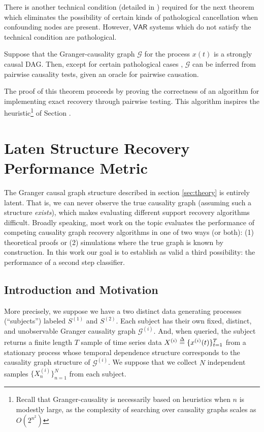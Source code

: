 \documentclass[12pt]{article}
\def\gcg{\mathcal{G}}  %
\def\VAR{\mathsf{VAR}}  %
\begin{document}
  There is another technical condition (detailed in
  \cite{my_GC_paper}) required for the next theorem which eliminates
  the possibility of certain kinds of pathological cancellation when
  confounding nodes are present.  However, $\VAR$ systems which do not
  satisfy the technical condition are pathological.

  \begin{theorem}
    \label{thm:scg_recovery}
    Suppose that the Granger-causality graph $\gcg$ for the process
    $x(t)$ is a strongly causal DAG.  Then, except for certain
    pathological cases \cite{my_GC_paper}, $\gcg$ can be inferred from
    pairwise causality tests, given an oracle for pairwise causation.
  \end{theorem}

  The proof of this theorem proceeds by proving the correctness of an
  algorithm for implementing exact recovery through pairwise testing.
  This algorithm inspires the heuristic\footnote{Recall that
    Granger-causality is necessarily based on heuristics when $n$ is
    modestly large, as the complexity of searching over causality
    graphs scales as $O(2^{n^2})$} of Section
  \cite{sec:structure_learning}.

\section{Laten Structure Recovery Performance Metric}
The Granger causal graph structure described in section
\ref{sec:theory} is entirely latent.  That is, we can never observe
the true causality graph (assuming such a structure \textit{exists}),
which makes evaluating different support recovery algorithms
difficult.  Broadly speaking, most work on the topic evaluates the
performance of competing causality graph recovery algorithms in one of
two ways (or both): (1) theoretical proofs or (2) simulations where
the true graph is known by construction.  In this work our goal is to
establish as valid a third possibility: the performance of a second
step classifier.

\subsection{Introduction and Motivation}
More precisely, we suppose we have a two distinct data generating
processes (``subjects'') labeled $S^{(1)}$ and $S^{(2)}$.  Each
subject has their own fixed, distinct, and unobservable Granger
causality graph $\gcg^{(i)}$.  And, when queried, the subject
returns%
a finite length $T$ sample of time series data
$X^{(i)} \overset{\Delta}{=} \{x^{(i)}(t)\}_{t = 1}^{T}$ from a stationary process
whose temporal dependence structure corresponds to the causality graph
structure of $\gcg^{(i)}$.  We suppose that we collect $N$ independent
samples $\{X^{(i)}_n\}_{n = 1}^N$ from each subject.
\end{document}
